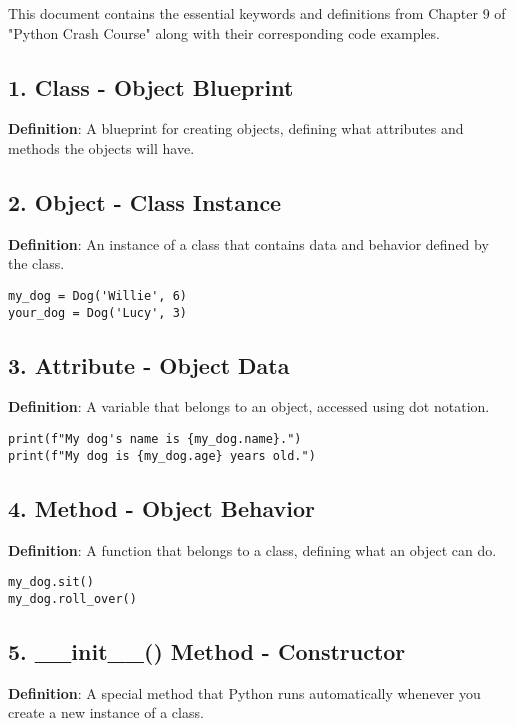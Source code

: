 
This document contains the essential keywords and definitions from Chapter 9 of "Python Crash Course" along with their corresponding code examples.

\subsection*{1. Class - Object Blueprint}
\textbf{Definition}: A blueprint for creating objects, defining what attributes and methods the objects will have.



\subsection*{2. Object - Class Instance}
\textbf{Definition}: An instance of a class that contains data and behavior defined by the class.

\begin{lstlisting}
my_dog = Dog('Willie', 6)
your_dog = Dog('Lucy', 3)
\end{lstlisting}

\subsection*{3. Attribute - Object Data}
\textbf{Definition}: A variable that belongs to an object, accessed using dot notation.

\begin{lstlisting}
print(f"My dog's name is {my_dog.name}.")
print(f"My dog is {my_dog.age} years old.")
\end{lstlisting}

\subsection*{4. Method - Object Behavior}
\textbf{Definition}: A function that belongs to a class, defining what an object can do.

\begin{lstlisting}
my_dog.sit()
my_dog.roll_over()
\end{lstlisting}

\subsection*{5. \_\_init\_\_() Method - Constructor}
\textbf{Definition}: A special method that Python runs automatically whenever you create a new instance of a class.

